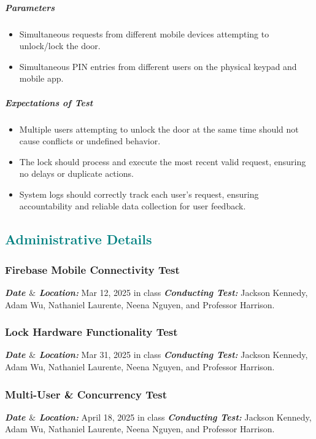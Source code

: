 \documentclass[a4paper,12pt]{article}
\begin{document}
\subparagraph{Parameters}
\begin{itemize}
    \item Simultaneous requests from different mobile devices attempting to unlock/lock the door.
    \item Simultaneous PIN entries from different users on the physical keypad and mobile app.
\end{itemize}

\subparagraph{Expectations of Test}
\begin{itemize}
    \item Multiple users attempting to unlock the door at the same time should not cause conflicts or undefined behavior.
    \item The lock should process and execute the most recent valid request, ensuring no delays or duplicate actions.
    \item System logs should correctly track each user’s request, ensuring accountability and reliable data collection for user feedback.
\end{itemize}
\newpage

\textcolor{teal}{\subsection*{Administrative Details}}

\subsubsection{Firebase Mobile Connectivity Test}
\textbf{\textit{Date $\&$ Location:}} Mar 12, 2025 in class
\newline
\textbf{\textit{Conducting Test:}} Jackson Kennedy, Adam Wu, Nathaniel Laurente, Neena Nguyen, and Professor Harrison.

\subsubsection{Lock Hardware Functionality Test}
\textbf{\textit{Date $\&$ Location:}} Mar 31, 2025 in class
\newline
\textbf{\textit{Conducting Test:}} Jackson Kennedy, Adam Wu, Nathaniel Laurente, Neena Nguyen, and Professor Harrison.

\subsubsection{Multi-User \& Concurrency Test}
\textbf{\textit{Date $\&$ Location:}} April 18, 2025 in class
\newline
\textbf{\textit{Conducting Test:}} Jackson Kennedy, Adam Wu, Nathaniel Laurente, Neena Nguyen, and Professor Harrison.
\end{document}

